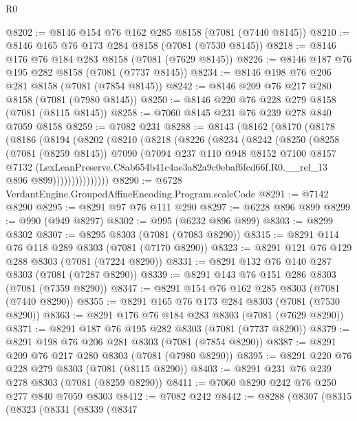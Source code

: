 \begin{lexlean}{R0}
\begin{coremodule}
@8202 := @8146 @154 @76 @162 @285 @8158 (@7081 (@7440 @8145))
@8210 := @8146 @165 @76 @173 @284 @8158 (@7081 (@7530 @8145))
@8218 := @8146 @176 @76 @184 @283 @8158 (@7081 (@7629 @8145))
@8226 := @8146 @187 @76 @195 @282 @8158 (@7081 (@7737 @8145))
@8234 := @8146 @198 @76 @206 @281 @8158 (@7081 (@7854 @8145))
@8242 := @8146 @209 @76 @217 @280 @8158 (@7081 (@7980 @8145))
@8250 := @8146 @220 @76 @228 @279 @8158 (@7081 (@8115 @8145))
@8258 := @7060 @8145 @231 @76 @239 @278 @840 @7059 @8158
@8259 := @7082 @231
@8288 := @8143
    (@8162
      (@8170
        (@8178
          (@8186
            (@8194
              (@8202
                (@8210
                  (@8218
                    (@8226
                      (@8234
                        (@8242
                          (@8250
                            (@8258
                              (@7081 (@8259 @8145))
                              @7090
                              (@7094
                                @237
                                @110
                                @948
                                @8152
                                @7100
                                @8157
                                @7132
                                (LexLeanPreserve.C8ab654b41c4ae3a82a9c0ebaf6fcd66f.R0.__rel_13
                                  @896
                                  @899)))))))))))))))
@8290 := @6728 VerdantEngine.GroupedAffineEncoding.Program.scaleCode
@8291 := @7142 @8290
@8295 := @8291 @97 @76 @111 @290
@8297 := @6228 @896 @899
@8299 := @990 (@949 @8297)
@8302 := @995 (@6232 @896 @899)
@8303 := @8299 @8302
@8307 := @8295 @8303 (@7081 (@7083 @8290))
@8315 := @8291 @114 @76 @118 @289 @8303 (@7081 (@7170 @8290))
@8323 := @8291 @121 @76 @129 @288 @8303 (@7081 (@7224 @8290))
@8331 := @8291 @132 @76 @140 @287 @8303 (@7081 (@7287 @8290))
@8339 := @8291 @143 @76 @151 @286 @8303 (@7081 (@7359 @8290))
@8347 := @8291 @154 @76 @162 @285 @8303 (@7081 (@7440 @8290))
@8355 := @8291 @165 @76 @173 @284 @8303 (@7081 (@7530 @8290))
@8363 := @8291 @176 @76 @184 @283 @8303 (@7081 (@7629 @8290))
@8371 := @8291 @187 @76 @195 @282 @8303 (@7081 (@7737 @8290))
@8379 := @8291 @198 @76 @206 @281 @8303 (@7081 (@7854 @8290))
@8387 := @8291 @209 @76 @217 @280 @8303 (@7081 (@7980 @8290))
@8395 := @8291 @220 @76 @228 @279 @8303 (@7081 (@8115 @8290))
@8403 := @8291 @231 @76 @239 @278 @8303 (@7081 (@8259 @8290))
@8411 := @7060 @8290 @242 @76 @250 @277 @840 @7059 @8303
@8412 := @7082 @242
@8442 := @8288
    (@8307
      (@8315
        (@8323
          (@8331
            (@8339
              (@8347

\end{coremodule}
\end{lexlean}
